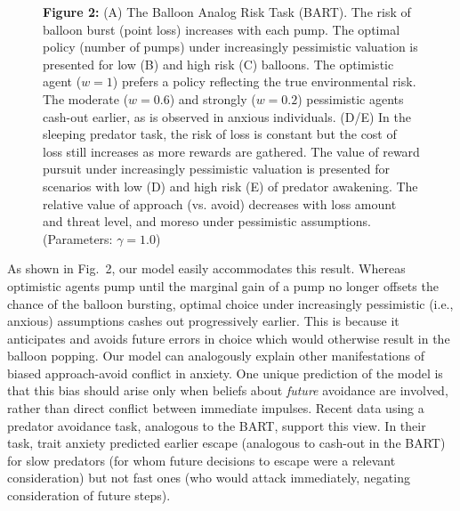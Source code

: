 \documentclass[11pt]{article} %
\begin{document}
\begin{figure}
  \centerline{%
  }
  \par \textbf{Figure 2:} (A) The Balloon Analog Risk Task (BART). The risk of balloon burst (point loss) increases with each pump. The optimal policy (number of pumps) under increasingly pessimistic valuation is presented for low (B) and high risk (C) balloons. The optimistic agent ($w=1$) prefers a policy reflecting the true environmental risk. The moderate ($w=0.6$) and strongly ($w=0.2$) pessimistic agents cash-out earlier, as is observed in anxious individuals. (D/E) In the sleeping predator task, the risk of loss is constant but the cost of loss still increases as more rewards are gathered. The value of reward pursuit under increasingly pessimistic valuation is presented for scenarios with low (D) and high risk (E)  of predator awakening. The relative value of approach (vs. avoid) decreases with loss amount and threat level, and moreso under pessimistic assumptions. (Parameters: $\gamma = 1.0$)
\end{figure}

As shown in Fig.~2, our model easily accommodates this result. Whereas optimistic agents pump until the marginal gain of a pump no longer offsets the chance of the balloon bursting, optimal choice under increasingly pessimistic (i.e., anxious) assumptions cashes out progressively earlier. This is because it anticipates and avoids future errors in choice which would otherwise result in the balloon popping. Our model can analogously explain other manifestations of biased approach-avoid conflict in anxiety\cite{Mobbs2019}. One unique prediction of the model is that this bias should arise only when beliefs about \emph{future} avoidance are involved, rather than direct conflict between immediate impulses. Recent data \cite{Mobbs2019} using a predator avoidance task, analogous to the BART, support this view. In their task, trait anxiety predicted earlier escape (analogous to cash-out in the BART) for slow predators (for whom future decisions to escape were a relevant consideration) but not fast ones (who would attack immediately, negating consideration of future steps). 
\end{document}
